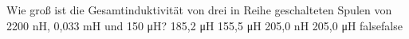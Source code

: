     {Wie groß ist die Gesamtinduktivität von drei in Reihe geschalteten Spulen von 2200 nH, 0,033 mH und 150 \si{\micro\henry}?}
    {185,2 \si{\micro\henry}}
    {155,5 \si{\micro\henry}}
    {205,0 nH}
    {205,0 \si{\micro\henry}}
    {false}{false}
